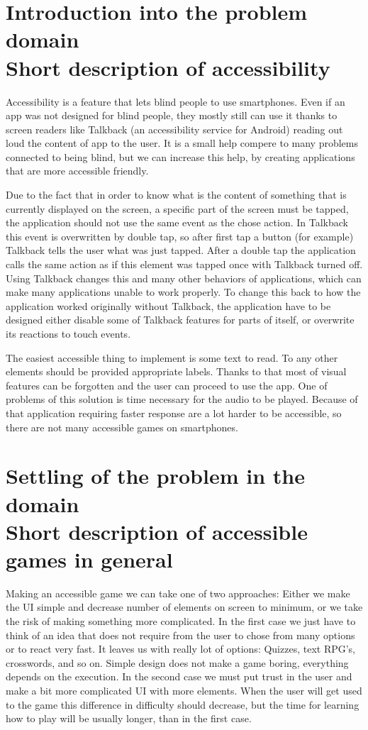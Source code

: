 \documentclass[a4paper,twoside,12pt]{book}
\begin{document}
\section{Introduction into the problem domain\\{\large Short description of accessibility}}
\par
Accessibility is a feature that lets blind people to use smartphones. Even if an app was not designed for blind people, they mostly still can use it thanks to screen readers like Talkback (an accessibility service for Android) reading out loud the content of app to the user. It is a small help compere to many problems connected to being blind, but we can increase this help, by creating applications that are more accessible friendly.
\par
Due to the fact that in order to know what is the content of something that is currently displayed on the screen, a specific part of the screen must be tapped, the application should not use the same event as the chose action. In Talkback this event is overwritten by double tap, so after first tap a button (for example) Talkback tells the user what was just tapped. After a double tap the application calls the same action as if this element was tapped once with Talkback turned off. Using Talkback changes this and many other behaviors of applications, which can make many applications unable to work properly. To change this back to how the application worked originally without Talkback, the application have to be designed either disable some of Talkback features for parts of itself, or overwrite its reactions to touch events.
\par
The easiest accessible thing to implement is some text to read. To any other elements should be provided appropriate labels. Thanks to that most of visual features can be forgotten and the user can proceed to use the app. One of problems of this solution is time necessary for the audio to be played. Because of that application requiring faster response are a lot harder to be accessible, so there are not many accessible games on smartphones.

\section{Settling of the problem in the domain\\{\large Short description of accessible games in general}}
\par
Making an accessible game we can take one of two approaches: Either we make the UI simple and decrease number of elements on screen to minimum, or we take the risk of making something more complicated. In the first case we just have to think of an idea that does not require from the user to chose from many options or to react very fast. It leaves us with really lot of options: Quizzes, text RPG's, crosswords, and so on. Simple design does not make a game boring, everything depends on the execution. In the second case we must put trust in the user and make a bit more complicated UI with more elements. When the user will get used to the game this difference in difficulty should decrease, but the time for learning how to play will be usually longer, than in the first case.
\end{document}
